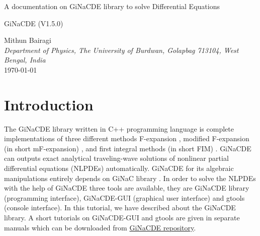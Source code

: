 \documentclass[prd,aps,floats,showkeys,nofootinbib,notitlepage]{revtex4-2}
\begin{document}
	\begin{titlepage}
		\begin{center}
			\Huge {A documentation on GiNaCDE library to solve Differential Equations} 
		\end{center}
		\vspace{3cm}
		\begin{center}
			\Large{GiNaCDE (V1.5.0)}
		\end{center}
		\vspace{2cm} 
		\begin{center} 
			Mithun Bairagi \\[3pt]  
			\textit{Department of Physics, The University of Burdwan, Golapbag 713104, West Bengal, India} \\ [1cm]
			\today
		\end{center}
	\end{titlepage}
	
	\clearpage
	
	\tableofcontents
	
	\section{Introduction}
	The GiNaCDE library written in C++ programming language is complete implementations of three different methods F-expansion \cite{fexpn024,fexpn024_1,fexpn123,0246,234}, modified F-expansion (in short mF-expansion) \cite{modfexpn}, and first integral methods (in short FIM) \cite{fim0,fim,mirza,complexTwt1}. GiNaCDE can outputs exact analytical traveling-wave solutions of nonlinear partial differential equations (NLPDEs) automatically.
	GiNaCDE for its algebraic manipulations entirely depends on GiNaC library \cite{ginac}.  
	In order to solve the NLPDEs with the help of GiNaCDE three tools are available, they are GiNaCDE library (programming interface), GiNaCDE-GUI (graphical user interface) and gtools (console interface). In this tutorial, we have described about the GiNaCDE library. A short tutorials on GiNaCDE-GUI and gtools are given in separate manuals which can be downloaded from \href{https://github.com/mithun218/GiNaCDE}{GiNaCDE repository}.
\end{document}
